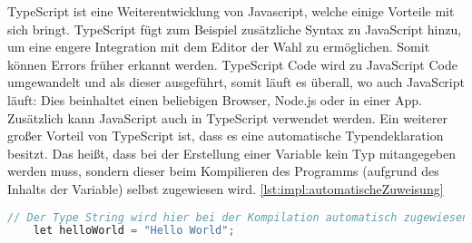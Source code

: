 TypeScript ist eine Weiterentwicklung von Javascript, welche einige Vorteile mit sich bringt. TypeScript fügt zum Beispiel zusätzliche Syntax zu JavaScript hinzu, um eine engere Integration mit dem Editor der Wahl zu ermöglichen. Somit können Errors früher erkannt werden. TypeScript Code wird zu JavaScript Code umgewandelt und als dieser ausgeführt, somit läuft es überall, wo auch JavaScript läuft: Dies beinhaltet einen beliebigen Browser, Node.js oder in einer App. Zusätzlich kann JavaScript auch in TypeScript verwendet werden. Ein weiterer großer Vorteil von TypeScript ist, dass es eine automatische Typendeklaration besitzt. Das heißt, dass bei der Erstellung einer Variable kein Typ mitangegeben werden muss, sondern dieser beim Kompilieren des Programms (aufgrund des Inhalts der Variable) selbst zugewiesen wird. \ref{lst:impl:automatischeZuweisung}
\cite{JavaScriptJavaEntwickler} 
\cite{TypeScriptOverview} 

\begin{lstlisting}[language=java,caption=TypeScript automatische Zuweisung,label=lst:impl:automatischeZuweisung]
    // Der Type String wird hier bei der Kompilation automatisch zugewiesen
    let helloWorld = "Hello World";
\end{lstlisting}